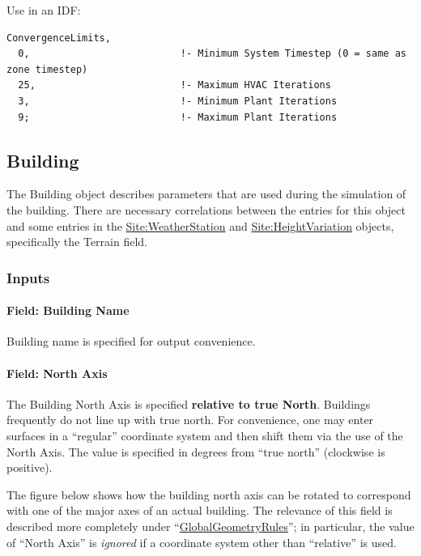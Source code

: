 Use in an IDF:

\begin{lstlisting}
ConvergenceLimits,
  0,                          !- Minimum System Timestep (0 = same as zone timestep)
  25,                         !- Maximum HVAC Iterations
  3,                          !- Minimum Plant Iterations
  9;                          !- Maximum Plant Iterations
\end{lstlisting}

\subsection{Building}\label{building}

The Building object describes parameters that are used during the simulation of the building. There are necessary correlations between the entries for this object and some entries in the \hyperref[siteweatherstation]{Site:WeatherStation} and \hyperref[siteheightvariation]{Site:HeightVariation} objects, specifically the Terrain field.

\subsubsection{Inputs}\label{inputs-3-034}

\paragraph{Field: Building Name}\label{field-building-name}

Building name is specified for output convenience.

\paragraph{Field: North Axis}\label{field-north-axis}

The Building North Axis is specified \textbf{relative to true North}. Buildings frequently do not line up with true north. For convenience, one may enter surfaces in a ``regular'' coordinate system and then shift them via the use of the North Axis. The value is specified in degrees from ``true north'' (clockwise is positive).

The figure below shows how the building north axis can be rotated to correspond with one of the major axes of an actual building. The relevance of this field is described more completely under ``\hyperref[globalgeometryrules]{GlobalGeometryRules}''; in particular, the value of ``North Axis'' is \emph{ignored} if a coordinate system other than ``relative'' is used.

